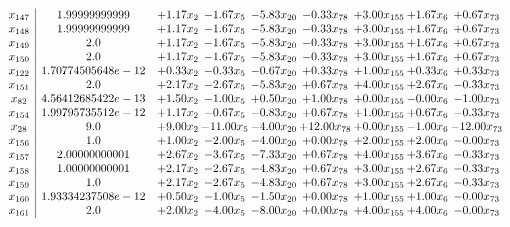 \documentclass[8pt]{article}
\begin{document}
\[\begin{array}{c| c c@{\hskip 2pt} c@{\hskip 2pt} c@{\hskip 2pt} c@{\hskip 2pt} c@{\hskip 2pt} c@{\hskip 2pt} c@{\hskip 2pt} }
 x_{147}   &  1.99999999999 & +  1.17 x_{2} & -1.67 x_{5} & -5.83 x_{20} & -0.33 x_{78} & +  3.00 x_{155} & +  1.67 x_{6} & +  0.67 x_{73}\\
 x_{148}   &  1.99999999999 & +  1.17 x_{2} & -1.67 x_{5} & -5.83 x_{20} & -0.33 x_{78} & +  3.00 x_{155} & +  1.67 x_{6} & +  0.67 x_{73}\\
 x_{149}   &  2.0 & +  1.17 x_{2} & -1.67 x_{5} & -5.83 x_{20} & -0.33 x_{78} & +  3.00 x_{155} & +  1.67 x_{6} & +  0.67 x_{73}\\
 x_{150}   &  2.0 & +  1.17 x_{2} & -1.67 x_{5} & -5.83 x_{20} & -0.33 x_{78} & +  3.00 x_{155} & +  1.67 x_{6} & +  0.67 x_{73}\\
 x_{122}   &  1.70774505648e-12 & +  0.33 x_{2} & -0.33 x_{5} & -0.67 x_{20} & +  0.33 x_{78} & +  1.00 x_{155} & +  0.33 x_{6} & +  0.33 x_{73}\\
 x_{151}   &  2.0 & +  2.17 x_{2} & -2.67 x_{5} & -5.83 x_{20} & +  0.67 x_{78} & +  4.00 x_{155} & +  2.67 x_{6} & -0.33 x_{73}\\
 x_{82}   &  4.56412685422e-13 & +  1.50 x_{2} & -1.00 x_{5} & +  0.50 x_{20} & +  1.00 x_{78} & +  0.00 x_{155} & -0.00 x_{6} & -1.00 x_{73}\\
 x_{154}   &  1.99795735512e-12 & +  1.17 x_{2} & -0.67 x_{5} & -0.83 x_{20} & +  0.67 x_{78} & +  1.00 x_{155} & +  0.67 x_{6} & -0.33 x_{73}\\
 x_{28}   &  9.0 & +  9.00 x_{2} & -11.00 x_{5} & -4.00 x_{20} & + 12.00 x_{78} & +  0.00 x_{155} & -1.00 x_{6} & -12.00 x_{73}\\
 x_{156}   &  1.0 & +  1.00 x_{2} & -2.00 x_{5} & -4.00 x_{20} & +  0.00 x_{78} & +  2.00 x_{155} & +  2.00 x_{6} & -0.00 x_{73}\\
 x_{157}   &  2.00000000001 & +  2.67 x_{2} & -3.67 x_{5} & -7.33 x_{20} & +  0.67 x_{78} & +  4.00 x_{155} & +  3.67 x_{6} & -0.33 x_{73}\\
 x_{158}   &  1.00000000001 & +  2.17 x_{2} & -2.67 x_{5} & -4.83 x_{20} & +  0.67 x_{78} & +  3.00 x_{155} & +  2.67 x_{6} & -0.33 x_{73}\\
 x_{159}   &  1.0 & +  2.17 x_{2} & -2.67 x_{5} & -4.83 x_{20} & +  0.67 x_{78} & +  3.00 x_{155} & +  2.67 x_{6} & -0.33 x_{73}\\
 x_{160}   &  1.93334237508e-12 & +  0.50 x_{2} & -1.00 x_{5} & -1.50 x_{20} & +  0.00 x_{78} & +  1.00 x_{155} & +  1.00 x_{6} & -0.00 x_{73}\\
 x_{161}   &  2.0 & +  2.00 x_{2} & -4.00 x_{5} & -8.00 x_{20} & +  0.00 x_{78} & +  4.00 x_{155} & +  4.00 x_{6} & -0.00 x_{73}\\

\end{array}\]
\end{document}
